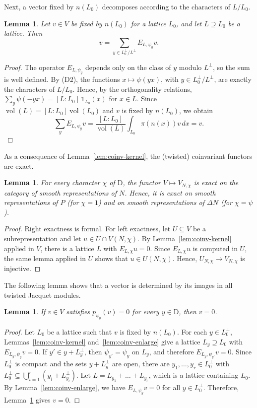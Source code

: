 \documentclass[11pt]{amsart}
\numberwithin{equation}{section}
\theoremstyle{plain}
\newtheorem{lemma}[theorem]{Lemma}
\theoremstyle{definition}
\theoremstyle{remark}
\newcommand{\one}{\mathds{1}}
\DeclareMathOperator{\vol}{vol}
\begin{document}
Next, a vector fixed by $n(L_0)$ decomposes according to the characters of $L/L_0$.

\begin{lemma}\label{lem:coinv-decomp}
	Let $v\in V$ be fixed by $n(L_0)$ for a lattice $L_0$, and let $L\supseteq L_0$ be a lattice. Then
	$$
	v=\sum_{y\in L_0^\perp/L^\perp}E_{L,\psi_y}v.
	$$
\end{lemma}

\begin{proof}
	The operator $E_{L,\psi_y}$ depends only on the class of $y$ modulo $L^\perp$, so the sum is well defined. By (D2), the functions $x\mapsto\psi(yx)$, with $y\in L_0^\perp/L^\perp$, are exactly the characters of $L/L_0$. Hence, by the orthogonality relations, $\sum_y\psi(-yx)=[L:L_0]\,\one_{L_0}(x)$ for $x\in L$. Since $\vol(L)=[L:L_0]\vol(L_0)$ and $v$ is fixed by $n(L_0)$, we obtain
	$$\sum_yE_{L,\psi_y}v=\frac{[L:L_0]}{\vol(L)}\int_{L_0}\pi(n(x))v\,dx=v.$$
\end{proof}

As a consequence of Lemma~\ref{lem:coinv-kernel}, the (twisted) coinvariant functors are exact.

\begin{lemma}\label{lem:coinv-exact}
	For every character $\chi$ of $\mathrm{D}$, the functor $V\mapsto V_{N,\chi}$ is exact on the category of smooth representations of $N$. Hence, it is exact on smooth representations of $P$ (for $\chi=1$) and on smooth representations of $\Delta N$ (for $\chi=\psi$).
\end{lemma}

\begin{proof}
	Right exactness is formal. For left exactness, let $U\subseteq V$ be a subrepresentation and let $u\in U\cap V(N,\chi)$. By Lemma~\ref{lem:coinv-kernel} applied in $V$, there is a lattice $L$ with $E_{L,\chi}u=0$. Since $E_{L,\chi}u$ is computed in $U$, the same lemma applied in $U$ shows that $u\in U(N,\chi)$. Hence, $U_{N,\chi}\to V_{N,\chi}$ is injective.
\end{proof}

The following lemma shows that a vector is determined by its images in all twisted Jacquet modules.

\begin{lemma}\label{lem:coinv-vanish}
	If $v\in V$ satisfies $p_{\psi_y}(v)=0$ for every $y\in \mathrm{D}$, then $v=0$.
\end{lemma}

\begin{proof}
	Let $L_0$ be a lattice such that $v$ is fixed by $n(L_0)$. For each $y\in L_0^\perp$, Lemmas~\ref{lem:coinv-kernel} and~\ref{lem:coinv-enlarge} give a lattice $L_y\supseteq L_0$ with $E_{L_y,\psi_y}v=0$. If $y'\in y+L_y^\perp$, then $\psi_{y'}=\psi_y$ on $L_y$, and therefore $E_{L_y,\psi_{y'}}v=0$. Since $L_0^\perp$ is compact and the sets $y+L_y^\perp$ are open, there are $y_1,\dots,y_r\in L_0^\perp$ with $L_0^\perp\subseteq\bigcup_{i=1}^r(y_i+L_{y_i}^\perp)$. Let $L=L_{y_1}+\dots+L_{y_r}$, which is a lattice containing $L_0$. By Lemma~\ref{lem:coinv-enlarge}, we have $E_{L,\psi_y}v=0$ for all $y\in L_0^\perp$. Therefore, Lemma~\ref{lem:coinv-decomp} gives $v=0$.
\end{proof}
\end{document}
